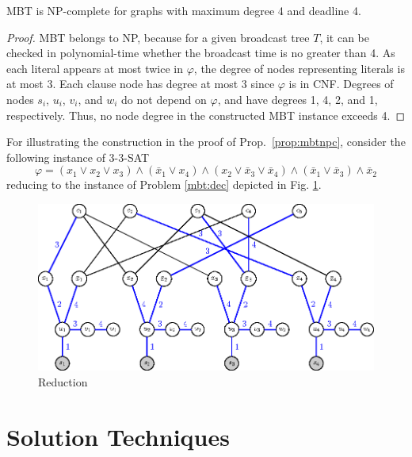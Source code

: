 \begin{proposition}
MBT is NP-complete for graphs with maximum degree 4 and deadline 4.
\end{proposition}
\begin{proof}
MBT  belongs to NP, because for a given broadcast tree $T$, it can be checked in polynomial-time whether the broadcast time is no greater than 4.
As each literal appears at most twice in $\varphi$, the degree of nodes representing literals is at most 3. 
Each clause node has degree at most 3 since $\varphi$ is in CNF.
Degrees of nodes $s_i$, $u_i$, $v_i$, and $w_i$ do not depend on $\varphi$, and have degrees 1, 4, 2, and 1, respectively.
Thus, no node degree in the constructed MBT instance exceeds 4.
\end{proof}
For illustrating the construction in the proof of Prop.~\ref{prop:mbtnpc}, consider the following instance of \textsc{3-3-SAT}
\begin{equation}
\varphi=(x_1\vee x_2\vee x_3)\wedge(\bar{x}_1\vee x_4)\wedge(x_2\vee \bar{x}_3 \vee\bar{x}_4)\wedge(\bar{x}_1\vee \bar{x}_3)\wedge \bar{x}_2 
\label{eq:phi}
\end{equation}
reducing to the instance of Problem \ref{mbt:dec} depicted in Fig. \ref{fig:mbtnpc}.
\begin{figure}
\centering
\includegraphics{figurer/mbtnpc.eps}
\caption{Reduction}
\label{fig:mbtnpc}
\end{figure}

\section{Solution Techniques}
